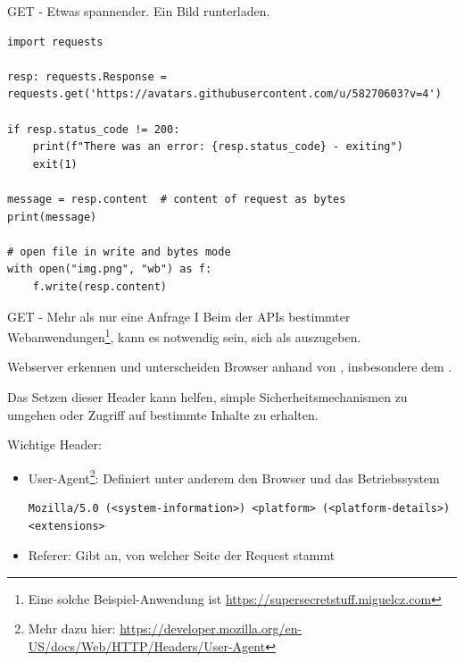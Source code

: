 \documentclass[12pt, aspectratio=169, usepdftitle=false]{beamer}
\begin{document}
\begin{frame}[fragile]{GET - Etwas spannender. Ein Bild runterladen.}
	
	\begin{lstlisting}[language=pytiny]
import requests

resp: requests.Response = requests.get('https://avatars.githubusercontent.com/u/58270603?v=4')

if resp.status_code != 200:
    print(f"There was an error: {resp.status_code} - exiting")
    exit(1)

message = resp.content  # content of request as bytes
print(message)

# open file in write and bytes mode
with open("img.png", "wb") as f:
    f.write(resp.content)
	\end{lstlisting}
\end{frame}

\begin{frame}[fragile]{GET - Mehr als nur eine Anfrage I}
		Beim  der APIs bestimmter Webanwendungen\footnote{Eine solche Beispiel-Anwendung ist \url{https://supersecretstuff.miguelcz.com}}, kann es notwendig sein, sich als  auszugeben.
		\pause
		
		\medskip
		
		Webserver erkennen und unterscheiden Browser anhand von , insbesondere dem .
		\pause
		
		\medskip
		
		Das Setzen dieser Header kann helfen, simple Sicherheitsmechanismen zu umgehen oder Zugriff auf bestimmte Inhalte zu erhalten.
		\pause
		
		\medskip
		
		Wichtige Header:
		\begin{itemize}
			\item User-Agent\footnote{Mehr dazu hier: \url{https://developer.mozilla.org/en-US/docs/Web/HTTP/Headers/User-Agent}}: Definiert unter anderem den Browser und das Betriebssystem
			\begin{lstlisting}[language=pytiny]
				Mozilla/5.0 (<system-information>) <platform> (<platform-details>) <extensions>
			\end{lstlisting}
			\item Referer: Gibt an, von welcher Seite der Request stammt
		\end{itemize}
\end{frame}
\end{document}
